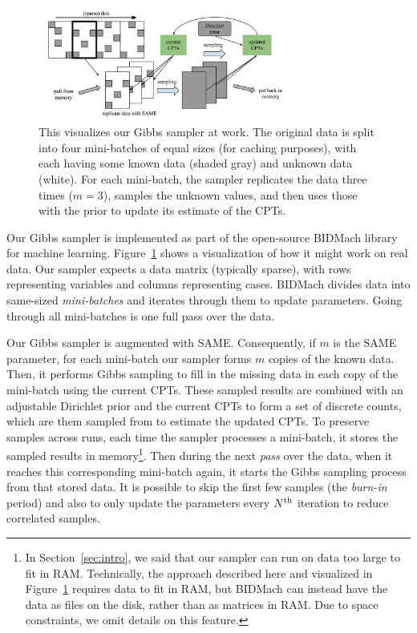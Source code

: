 \documentclass{article} %
\begin{document}
\begin{figure}[t]
\centering
\includegraphics[width=0.75\textwidth]{fig_BIDMach_final}
\caption{This visualizes our Gibbs sampler at work. The original data is split into four
mini-batches of equal sizes (for caching purposes), with each having some known data (shaded gray)
and unknown data (white). For each mini-batch, the sampler replicates the data three times ($m=3$),
samples the unknown values, and then uses those with the prior to update its estimate of the CPTs.}
\label{fig:BIDMach}
\end{figure}

Our Gibbs sampler is implemented as part of the open-source BIDMach library~\citep{bidmach} for
machine learning.  Figure~\ref{fig:BIDMach} shows a visualization of how it might work on real data.
Our sampler expects a data matrix (typically sparse), with rows representing variables and columns
representing cases. BIDMach divides data into same-sized \emph{mini-batches} and iterates through
them to update parameters. Going through all mini-batches is one full pass over the data.

Our Gibbs sampler is augmented with SAME. Consequently, if $m$ is the SAME parameter, for each
mini-batch our sampler forms $m$ copies of the known data.  Then, it performs Gibbs sampling to fill
in the missing data in each copy of the mini-batch using the current CPTs.  These sampled results
are combined with an adjustable Dirichlet prior and the current CPTs to form a set of discrete
counts, which are them sampled from to estimate the updated CPTs. To preserve samples across runs,
each time the sampler processes a mini-batch, it stores the sampled results in memory\footnote{In
Section~\ref{sec:intro}, we said that our sampler can run on data too large to fit in RAM.
Technically, the approach described here and visualized in Figure~\ref{fig:BIDMach} requires data to
fit in RAM, but BIDMach can instead have the data as files on the disk, rather than as matrices in
RAM. Due to space constraints, we omit details on this feature.}.  Then during the next \emph{pass}
over the data, when it reaches this corresponding mini-batch again, it starts the Gibbs sampling
process from that stored data. It is possible to skip the first few samples (the \emph{burn-in}
period) and also to only update the parameters every $N^{\rm th}$ iteration to reduce correlated
samples.
\end{document}
